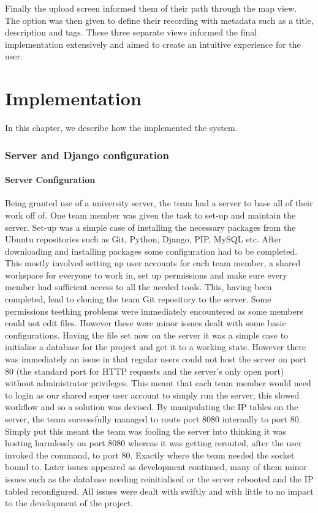 \documentclass{l3proj}
\begin{document}
Finally the upload screen informed them of their path through the map view. The option was then given to define their recording with metadata such as a title, description and tags. These three separate views informed the final implementation extensively and aimed to create an intuitive experience for the user.
\chapter{Implementation}
\label{impl}

In this chapter, we describe how the implemented the system.

\subsection{Server and Django configuration}

\subsubsection{Server Configuration}
Being granted use of a university server, the team had a server to base all of their work off of. One team member was given the task to set-up and maintain the server.
Set-up was a simple case of installing the necessary packages from the Ubuntu repositories such as Git, Python, Django, PIP, MySQL etc. After downloading and installing packages some configuration had to be completed. This mostly involved setting up user accounts for each team member, a shared workspace for everyone to work in, set up permissions and make sure every member had sufficient access to all the needed tools.
This, having been completed, lead to cloning the team Git repository to the server. Some permissions teething problems were immediately encountered as some members could not edit files. However these were minor issues dealt with some basic configurations.
Having the file set now on the server it was a simple case to initialise a database for the project and get it to a working state. However there was immediately an issue in that regular users could not host the server on port 80 (the standard port for HTTP requests and the server's only open port) without administrator privileges. This meant that each team member would need to login as our shared super user account to simply run the server; this slowed workflow and so a solution was devised. By manipulating the IP tables on the server, the team successfully managed to route port 8080 internally to port 80. Simply put this meant the team was fooling the server into thinking it was hosting harmlessly on port 8080 whereas it was getting rerouted, after the user invoked the command, to port 80. Exactly where the team needed the socket bound to.
Later issues appeared as development continued, many of them minor issues such as the database needing reinitialised or the server rebooted and the IP tabled reconfigured. All issues were dealt with swiftly and with little to no impact to the development of the project.
\end{document}
